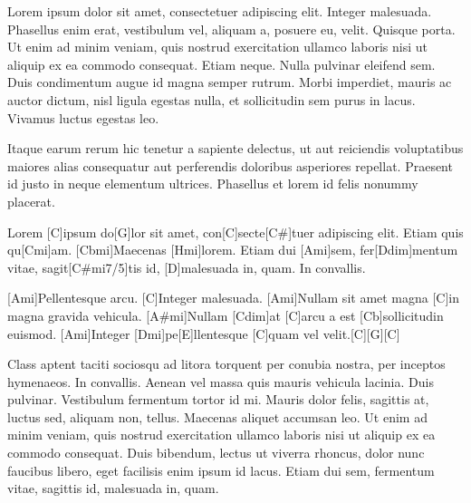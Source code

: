 \documentclass{article}
\begin{document}
Lorem ipsum dolor sit amet, consectetuer adipiscing elit. Integer malesuada.
Phasellus enim erat, vestibulum vel, aliquam a, posuere eu, velit. Quisque porta.
Ut enim ad minim veniam, quis nostrud exercitation ullamco laboris 
nisi ut aliquip ex ea commodo consequat. Etiam neque. Nulla pulvinar eleifend sem. 
Duis condimentum augue id magna semper rutrum. Morbi imperdiet, mauris ac auctor 
dictum, nisl ligula egestas nulla, et sollicitudin sem purus in lacus. Vivamus 
luctus egestas leo.

Itaque earum rerum hic tenetur a sapiente delectus, ut aut reiciendis voluptatibus 
maiores alias consequatur aut perferendis doloribus asperiores repellat. Praesent 
id justo in neque elementum ultrices. Phasellus et lorem id felis nonummy placerat.

\begin{guitar}
[Ami]Lorem [C]ipsum do[G]lor sit amet,
con[C]secte[C#]tuer adipiscing elit.
Etiam quis qu[Cmi]am. [Cbmi]Maecenas [Hmi]lorem.
Etiam dui [Ami]sem, fer[Ddim]mentum vitae,
sagit[C#mi7/5]tis id, [D]malesuada in, quam. In convallis.

[Ami]Pellentesque arcu. [C]Integer malesuada.
[Ami]Nullam sit amet magna [C]in magna gravida vehicula.
[A#mi]Nullam [Cdim]at [C]arcu a est [Cb]sollicitudin euismod.
[Ami]Integer [Dmi]pe[E]llentesque [C]quam vel velit.[C][G][C]
\end{guitar}

Class aptent taciti sociosqu ad litora torquent per conubia nostra, per inceptos 
hymenaeos. In convallis. Aenean vel massa quis mauris vehicula lacinia. Duis 
pulvinar. Vestibulum fermentum tortor id mi. Mauris dolor felis, sagittis at, 
luctus sed, aliquam non, tellus. Maecenas aliquet accumsan leo. Ut enim ad minim 
veniam, quis nostrud exercitation ullamco laboris nisi ut aliquip ex ea commodo 
consequat. Duis bibendum, lectus ut viverra rhoncus, dolor nunc faucibus libero, 
eget facilisis enim ipsum id lacus. Etiam dui sem, fermentum vitae, sagittis id, 
malesuada in, quam. 
\end{document}
